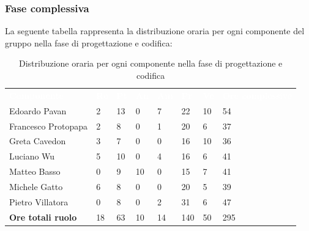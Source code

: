\subsubsection{Fase complessiva}
La seguente tabella rappresenta la distribuzione oraria per ogni componente del gruppo nella fase di progettazione e codifica:
\begin{table}[!htbp]
\begin{center}
\renewcommand{\arraystretch}{1.25}
\begin{tabular}{ m{}<{\centering}  m{}<{\centering} m{}<{\centering} m{}<{\centering}  m{}<{\centering}  m{}<{\centering}  m{}<{\centering}  m{}<{\centering}   }
	\rowcolor{darkblue}
	\textcolor{white}{\textbf{Componente}} &\textcolor{white}{\textbf{Re}}&\textcolor{white}{\textbf{Pt}}&\textcolor{white}{\textbf{An}}&\textcolor{white}{\textbf{Am}}&\textcolor{white}{\textbf{Pr}}&\textcolor{white}{\textbf{Ve}}&\textcolor{white}{\textbf{Ore complessive}}\\ 
	Edoardo Pavan & 2 & 13 & 0 & 7 & 22 & 10 & 54 \\	
	
	Francesco Protopapa & 2 & 8 & 0 & 1 & 20 & 6 & 37 \\

	Greta Cavedon & 3 & 7 & 0 & 0 & 16 & 10 & 36 \\
	
	Luciano Wu & 5 & 10 & 0 & 4 & 16 & 6 & 41 \\
	
	Matteo Basso & 0 & 9 & 10 & 0 & 15 & 7 & 41 \\
	
	Michele Gatto &  6 & 8 & 0 & 0 & 20 & 5 & 39 \\
	
	Pietro Villatora & 0 & 8 & 0 & 2 & 31 & 6 & 47 \\
	
	\textbf{Ore totali ruolo} & 18 & 63 & 10 & 14 & 140 & 50 & 295\\

\end{tabular}
\caption{Distribuzione oraria per ogni componente nella fase di progettazione e codifica}
\end{center}
\end{table}

